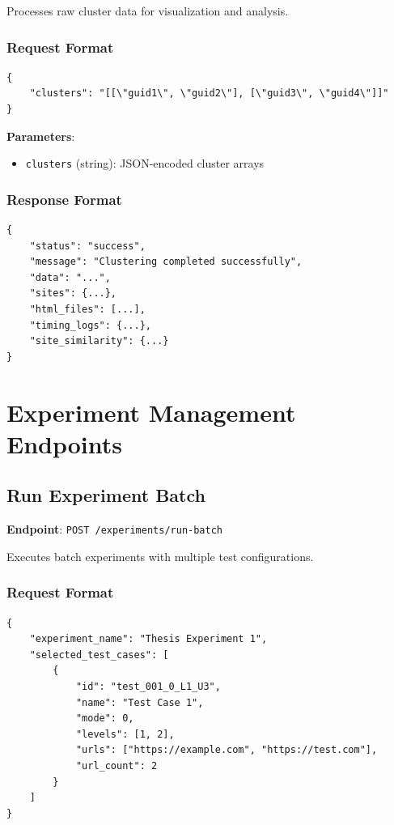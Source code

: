 Processes raw cluster data for visualization and analysis.

\subsubsection{Request Format}
\label{subsubsec:cluster-request}

\begin{verbatim}
{
    "clusters": "[[\"guid1\", \"guid2\"], [\"guid3\", \"guid4\"]]"
}
\end{verbatim}

\textbf{Parameters}:
\begin{itemize}
    \item \texttt{clusters} (string): JSON-encoded cluster arrays
\end{itemize}

\subsubsection{Response Format}
\label{subsubsec:cluster-response}

\begin{verbatim}
{
    "status": "success",
    "message": "Clustering completed successfully",
    "data": "...",
    "sites": {...},
    "html_files": [...],
    "timing_logs": {...},
    "site_similarity": {...}
}
\end{verbatim}

\section{Experiment Management Endpoints}
\label{sec:experiment-endpoints}

\subsection{Run Experiment Batch}
\label{subsec:experiment-batch}

\textbf{Endpoint}: \texttt{POST /experiments/run-batch}

Executes batch experiments with multiple test configurations.

\subsubsection{Request Format}
\label{subsubsec:experiment-request}

\begin{verbatim}
{
    "experiment_name": "Thesis Experiment 1",
    "selected_test_cases": [
        {
            "id": "test_001_0_L1_U3",
            "name": "Test Case 1",
            "mode": 0,
            "levels": [1, 2],
            "urls": ["https://example.com", "https://test.com"],
            "url_count": 2
        }
    ]
}
\end{verbatim}

